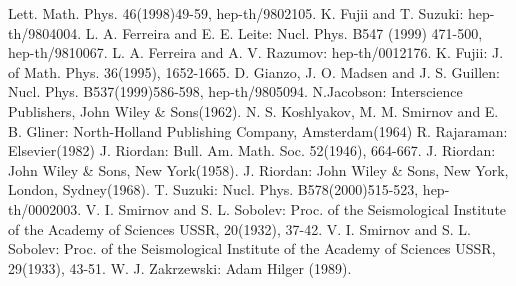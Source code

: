 \documentclass[makeidx,12pt,openany]{report}
\begin{document}
\begin{thebibliography}{99}
  \newblock Lett. Math. Phys. 46(1998)49-59, hep-th/9802105.
%
  K. Fujii and T. Suzuki:
  \newblock hep-th/9804004.
%
  L. A. Ferreira and E. E. Leite:
  \newblock Nucl. Phys. B547 (1999) 471-500, hep-th/9810067.
%
 L. A. Ferreira and A. V. Razumov:
 \newblock hep-th/0012176. 
%
  K. Fujii:
  \newblock J. of Math. Phys. 36(1995), 1652-1665.
%
  D. Gianzo, J. O. Madsen and J. S. Guillen:
  \newblock Nucl. Phys. B537(1999)586-598, hep-th/9805094.
%
 N.Jacobson:
  \newblock Interscience Publishers, John Wiley \& Sons(1962).
%
  N. S. Koshlyakov, M. M. Smirnov and E. B. Gliner:
  \newblock North-Holland Publishing Company, Amsterdam(1964)
%
  R. Rajaraman:
  \newblock Elsevier(1982)
%
  J. Riordan:
  \newblock Bull. Am. Math. Soc. 52(1946), 664-667.
%
  J. Riordan:
  \newblock John Wiley \& Sons, New York(1958).
%
  J. Riordan:
  \newblock John Wiley \& Sons, New York, London, Sydney(1968).
%
 T. Suzuki:
 \newblock Nucl. Phys. B578(2000)515-523, hep-th/0002003. 
%
  V. I. Smirnov and S. L. Sobolev:
  \newblock Proc. of the Seismological Institute of the Academy of Sciences USSR, 20(1932), 37-42.
%
  V. I. Smirnov and S. L. Sobolev:
  \newblock Proc. of the Seismological Institute of the Academy of Sciences USSR, 29(1933), 43-51.
%
  W. J. Zakrzewski:
  \newblock Adam Hilger (1989).
%
 \end{thebibliography}
%
\printindex
%
\end{document}
